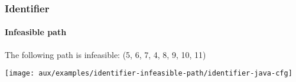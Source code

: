 \begin{frame}[hasprev=false, hasnext=false]
\frametitle{Identifier}
\framesubtitle{Infeasible path}
\label{example:identifier-infeasible-path}

The following path is infeasible: (5, 6, 7, 4, 8, 9, 10, 11)

\texttt{[image: aux/examples/identifier-infeasible-path/identifier-java-cfg]}
\end{frame}